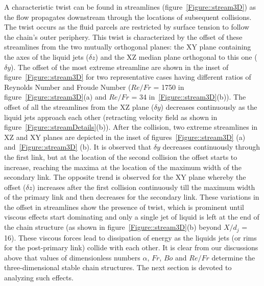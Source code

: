 \documentclass[%
 aip,
 sd,%
amsmath,amssymb,
preprint,%
author-year,%
]{revtex4-1}
\begin{document}
A characteristic twist can be found in streamlines (figure~\ref{Figure::stream3D}) as the flow propagates downstream through the locations of subsequent collisions. The twist occurs as the fluid parcels are restricted by surface tension to follow the chain's outer periphery. This twist is characterized by the offset of these streamlines from the two mutually orthogonal planes: the XY plane containing the axes of the liquid jets ($\delta z$) and the XZ median plane orthogonal to this one ($\delta y$). The offset of the most extreme streamline are shown in the inset of figure~\ref{Figure::stream3D} for two representative cases having different ratios of Reynolds Number and Froude Number ($Re/Fr$ = 1750 in figure~\ref{Figure::stream3D}(a) and $Re/Fr$ = 34 in~\ref{Figure::stream3D}(b)). The offset of all the streamlines from the XZ plane ($\delta y$) decreases continuously as the liquid jets approach each other (retracting velocity field as shown in figure~\ref{Figure::streamDetails}(b)). {\color{red}After the collision, two extreme streamlines in XZ and XY planes are depicted in the inset of figures~\ref{Figure::stream3D} (a) and~\ref{Figure::stream3D} (b).} It is observed that $\delta y$ decreases continuously through the first link, {\color{red}but at the location of the second collision the offset starts to increase, reaching the maxima} at the location of the maximum width of the secondary link. {\color{red}The opposite} trend is observed for the XY plane whereby the offset ($\delta z$) increases after the first collision continuously till the maximum width of the primary link and then decreases for the secondary link. These variations in the offset in streamlines show the presence of twist, which is prominent until viscous effects start dominating and only a single jet of liquid is left at the end of the chain structure (as shown in figure~\ref{Figure::stream3D}(b) beyond $X/d_j$ = 16). These viscous forces lead to dissipation of energy as the liquids jets (or rims for the post-primary link) collide with each other. It is clear from our discussions above {\color{red}that values of dimensionless numbers $\alpha$, $Fr$, $Bo$ and $Re/Fr$ determine the three-dimensional stable chain structures. The next section is devoted to analyzing such effects.}
\end{document}
